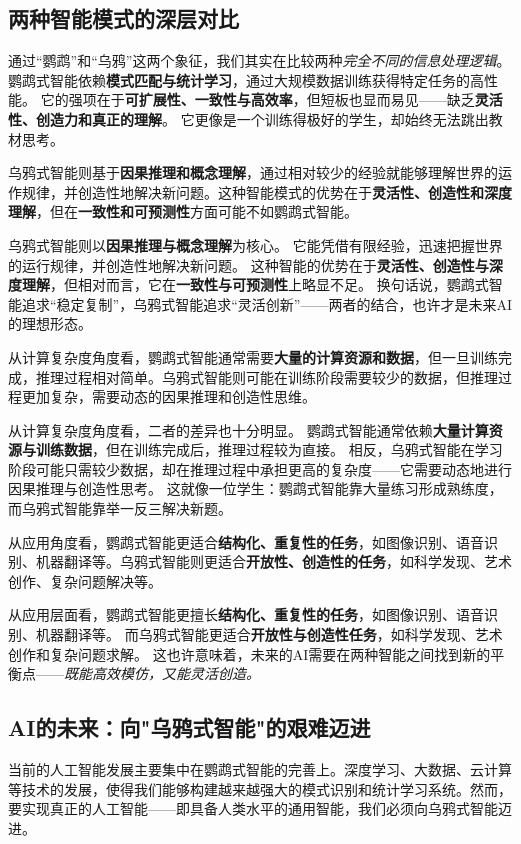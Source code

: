 \subsection{两种智能模式的深层对比}

通过“鹦鹉”和“乌鸦”这两个象征，我们其实在比较两种\emph{完全不同的信息处理逻辑}。
鹦鹉式智能依赖\textbf{模式匹配与统计学习}，通过大规模数据训练获得特定任务的高性能。
它的强项在于\textbf{可扩展性、一致性与高效率}，但短板也显而易见——缺乏\textbf{灵活性、创造力和真正的理解}。
它更像是一个训练得极好的学生，却始终无法跳出教材思考。

乌鸦式智能则基于\textbf{因果推理和概念理解}，通过相对较少的经验就能够理解世界的运作规律，并创造性地解决新问题。这种智能模式的优势在于\textbf{灵活性、创造性和深度理解}，但在\textbf{一致性和可预测性}方面可能不如鹦鹉式智能。


乌鸦式智能则以\textbf{因果推理与概念理解}为核心。
它能凭借有限经验，迅速把握世界的运行规律，并创造性地解决新问题。
这种智能的优势在于\textbf{灵活性、创造性与深度理解}，但相对而言，它在\textbf{一致性与可预测性}上略显不足。
换句话说，鹦鹉式智能追求“稳定复制”，乌鸦式智能追求“灵活创新”——两者的结合，也许才是未来AI的理想形态。

从计算复杂度角度看，鹦鹉式智能通常需要\textbf{大量的计算资源和数据}，但一旦训练完成，推理过程相对简单。乌鸦式智能则可能在训练阶段需要较少的数据，但推理过程更加复杂，需要动态的因果推理和创造性思维。

从计算复杂度角度看，二者的差异也十分明显。
鹦鹉式智能通常依赖\textbf{大量计算资源与训练数据}，但在训练完成后，推理过程较为直接。
相反，乌鸦式智能在学习阶段可能只需较少数据，却在推理过程中承担更高的复杂度——它需要动态地进行因果推理与创造性思考。
这就像一位学生：鹦鹉式智能靠大量练习形成熟练度，而乌鸦式智能靠举一反三解决新题。


从应用角度看，鹦鹉式智能更适合\textbf{结构化、重复性的任务}，如图像识别、语音识别、机器翻译等。乌鸦式智能则更适合\textbf{开放性、创造性的任务}，如科学发现、艺术创作、复杂问题解决等。

从应用层面看，鹦鹉式智能更擅长\textbf{结构化、重复性的任务}，如图像识别、语音识别、机器翻译等。
而乌鸦式智能更适合\textbf{开放性与创造性任务}，如科学发现、艺术创作和复杂问题求解。
这也许意味着，未来的AI需要在两种智能之间找到新的平衡点——\emph{既能高效模仿，又能灵活创造。}
\subsection{AI的未来：向"乌鸦式智能"的艰难迈进}

当前的人工智能发展主要集中在鹦鹉式智能的完善上。深度学习、大数据、云计算等技术的发展，使得我们能够构建越来越强大的模式识别和统计学习系统。然而，要实现真正的人工智能——即具备人类水平的通用智能，我们必须向乌鸦式智能迈进。


